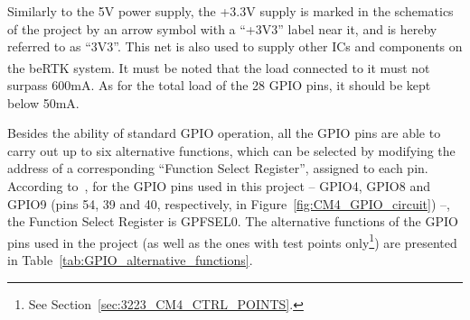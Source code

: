 Similarly to the 5V power supply, the +3.3V supply is marked in the schematics of the project by an arrow symbol with a ``+3V3'' label near it, and is hereby referred to as ``3V3''. This net is also used to supply other ICs and components on the beRTK\textsuperscript{\textregistered} system. It must be noted that the load connected to it must not surpass 600mA. As for the total load of the 28 GPIO pins, it should be kept below 50mA.

Besides the ability of standard GPIO operation, all the GPIO pins are able to carry out up to six alternative functions, which can be selected by modifying the address of a corresponding ``Function Select Register'', assigned to each pin. According to~\cite{BCM2711}, for the GPIO pins used in this project -- GPIO4, GPIO8 and GPIO9 (pins 54, 39 and 40, respectively, in Figure~\ref{fig:CM4_GPIO_circuit}) --, the Function Select Register is GPFSEL0. The alternative functions of the GPIO pins used in the project (as well as the ones with test points only\footnote[16]{See Section~\ref{sec:3223_CM4_CTRL_POINTS}.}) are presented in Table~\ref{tab:GPIO_alternative_functions}.

\begingroup
\begin{table}[h]
	\caption{Alternative function assignment of the GPIO pins used in the project (adapted from~\cite{CM4}).}
	\label{tab:GPIO_alternative_functions}
	\centering
\end{table}
\endgroup

